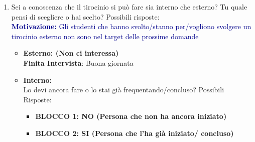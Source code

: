 \begin{itemize}
\begin{itemize}
\begin{enumerate}
{            cercando di estrapolare in maniera indiretta le informazioni chiave che l'utente ricerca (utili per la
            creazione del questionario)}
            \item Sei a conoscenza che il tirocinio si può fare sia interno che esterno? Tu quale pensi di scegliere o hai scelto? Possibili risposte:\\
            \textcolor{darkblue}{\textbf{Motivazione:} Gli studenti che hanno svolto/stanno per/vogliono svolgere un tirocinio esterno non sono nel target delle prossime domande}
            \begin{itemize}
                \item \textbf{Esterno: (Non ci interessa)}\\
                \textbf{Finita Intervista}: Buona giornata
                \item \textbf{Interno:}\\
                Lo devi ancora fare o lo stai già frequentando/concluso? Possibili Risposte:
                \begin{itemize}
                    \item \textbf{BLOCCO 1: NO (Persona che non ha ancora iniziato)}
                    \item \textbf{BLOCCO 2: SI (Persona che l'ha già iniziato/ concluso)}
                \end{itemize}
            \end{itemize}
        \end{enumerate}
    \end{itemize}
\end{itemize}

